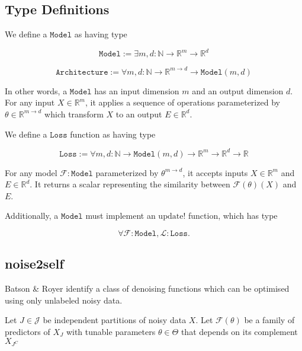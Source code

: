 \documentclass{article}
\begin{document}
\subsection{Type Definitions}
We define a $\mathtt{Model}$ as having type

\begin{equation}
  \mathtt{Model} := \exists m,d : \mathbb{N} \to \mathbb{R}^m \to \mathbb{R}^d
\end{equation}

\begin{equation}
  \mathtt{Architecture} := \forall m,d : \mathbb{N} \to \mathbb{R}^{m \to d} \to \mathtt{Model}(m,d)
\end{equation}


In other words, a $\mathtt{Model}$ has an input dimension $m$ and an output dimension $d$. For any input $X \in \mathbb{R}^m$,
it applies a sequence of operations parameterized by $\theta \in \mathbb{R}^{m \to d}$ which transform $X$ to an output $E \in \mathbb{R}^d$.

We define a $\mathtt{Loss}$ function as having type

\begin{equation}
  \mathtt{Loss} := \forall m,d : \mathbb{N} \to \mathtt{Model}(m,d) \to \mathbb{R}^m \to \mathbb{R}^d \to \mathbb{R}
\end{equation}

For any model $\mathcal{F} : \mathtt{Model}$ parameterized by $\theta^{m \to d}$, it accepts inputs $X \in \mathbb{R}^m$ and $E \in \mathbb{R}^d$.
It returns a scalar representing the similarity between $\mathcal{F}(\theta)(X)$ and $E$.

Additionally, a $\mathtt{Model}$ must implement an $\mathrm{update!}$ function, which has type


\begin{equation}
  \forall  \mathcal{F} : \mathtt{Model}, \mathcal{L} : \mathtt{Loss}. 
\end{equation}


\subsection{noise2self}

Batson \& Royer\cite{batson2019noise2self} identify a class of denoising functions which can be optimised using only unlabeled noisy data.

Let $J \in \mathcal{J}$ be independent partitions of noisy data $X$. Let $\mathcal{F}(\theta)$ be a family of predictors of $X_J$ with tunable parameters $\theta \in \Theta$ that depends on its complement $X_{J^C}$
\end{document}
